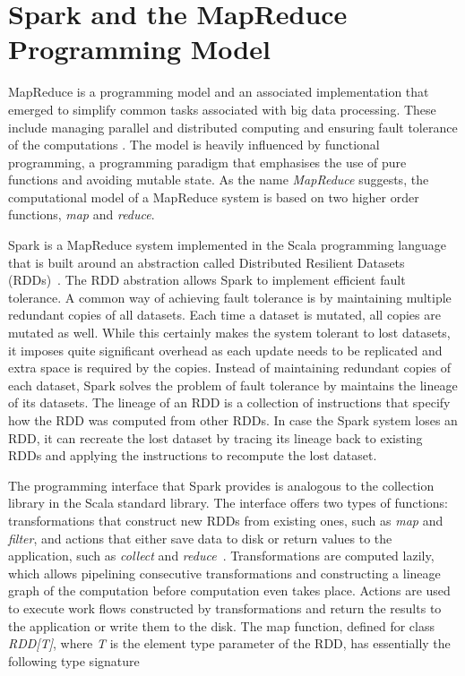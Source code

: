 \section{Spark and the MapReduce Programming Model}

MapReduce is a programming model and an associated implementation that emerged to simplify common tasks associated with big data processing. These include managing parallel and distributed computing and ensuring fault tolerance of the computations \cite{Dean:2008:MSD:1327452.1327492}. The model is heavily influenced by functional programming, a programming paradigm that emphasises the use of pure functions and avoiding mutable state. As the name \textit{MapReduce} suggests, the computational model of a MapReduce system is based on two higher order functions, \textit{map} and \textit{reduce}. 

Spark is a MapReduce system implemented in the Scala programming language that is built around an abstraction called Distributed Resilient Datasets (RDDs)~\cite{Zaharia:2012:RDD:2228298.2228301}. The RDD abstration allows Spark to implement efficient fault tolerance. A common way of achieving fault tolerance is by maintaining multiple redundant copies of all datasets. Each time a dataset is mutated, all copies are mutated as well. While this certainly makes the system tolerant to lost datasets, it imposes quite significant overhead as each update needs to be replicated and extra space is required by the copies. Instead of maintaining redundant copies of each dataset, Spark solves the problem of fault tolerance by maintains the lineage of its datasets. The lineage of an RDD is a collection of instructions that specify how the RDD was computed from other RDDs. In case the Spark system loses an RDD, it can recreate the lost dataset by tracing its lineage back to existing RDDs and applying the instructions to recompute the lost dataset.       

The programming interface that Spark provides is analogous to the collection library in the Scala standard library. The interface offers two types of functions: transformations that construct new RDDs from existing ones, such as \textit{map} and \textit{filter}, and actions that either save data to disk or return values to the application, such as \textit{collect} and \textit{reduce}~\cite{Zaharia:2012:RDD:2228298.2228301}. Transformations are computed lazily, which allows pipelining consecutive transformations and constructing a lineage graph of the computation before computation even takes place. Actions are used to execute work flows constructed by transformations and return the results to the application or write them to the disk. The map function, defined for class \textit{RDD[T]}, where \textit{T} is the element type parameter of the RDD, has essentially the following type signature

